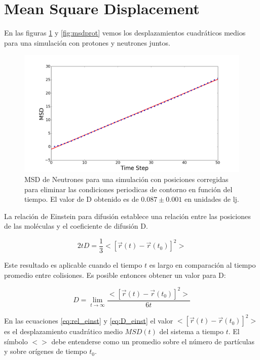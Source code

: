 \documentclass[
 reprint,
 amsmath,amssymb,
 aps,
 a4paper
]{revtex4-1}
\begin{document}
\section{\label{seq:msd}Mean Square Displacement}
En las figuras \ref{fig:msdneut} y \ref{fig:msdprot} vemos los desplazamientos cuadráticos medios para una simulación con protones y neutrones juntos.
\begin{figure}[H]
\centerline{
  \includegraphics[width=1.0\linewidth]{msdvst_neut.png}}
  \caption{\small MSD de Neutrones para una simulación con posiciones corregidas para eliminar las condiciones periodicas de contorno en función del tiempo. El valor de D obtenido es de $0.087 \pm 0.001$ en unidades de lj.}
  \label{fig:msdneut}
\end{figure}

La relación de Einstein para difusión establece una relación entre las posiciones de las moléculas y el coeficiente de difusión D.

\begin{equation}\label{eq:rel_einst}
2tD=\frac{1}{3}<[\vec{r}(t)-\vec{r}(t_0)]^2>
\end{equation}

Este resultado es aplicable cuando el tiempo $t$ es largo en comparación al tiempo promedio entre colisiones. Es posible entonces obtener un valor para D:

\begin{equation}\label{eq:D_einst}
D=\lim_{t \to \infty}\frac{<[\vec{r}(t)-\vec{r}(t_0)]^2>}{6t}
\end{equation} 

En las ecuaciones \ref{eq:rel_einst} y \ref{eq:D_einst} el valor $<[\vec{r}(t)-\vec{r}(t_0)]^2>$ es el desplazamiento cuadrático medio $MSD(t)$ del sistema  a tiempo $t$. El símbolo $<>$ debe entenderse como un promedio sobre el número de partículas y sobre orígenes de tiempo $t_0$.
\end{document}
